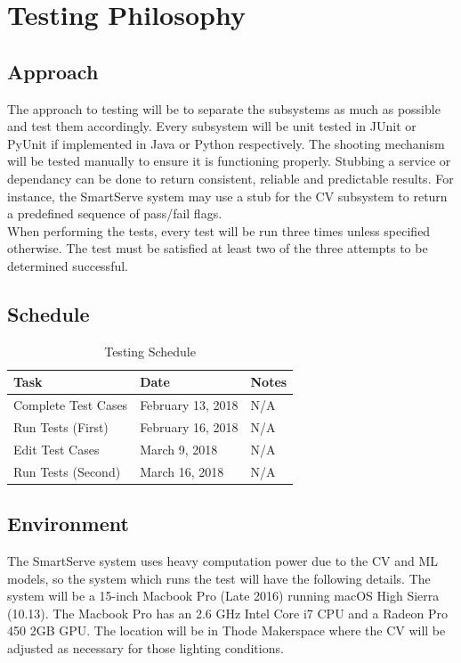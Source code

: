 \documentclass[11pt]{article}
\begin{document}
\section{Testing Philosophy}
\subsection{Approach}
The approach to testing will be to separate the subsystems as much as possible and test them accordingly. Every subsystem will be unit tested in JUnit or PyUnit if implemented in Java or Python respectively. The shooting mechanism will be tested manually to ensure it is functioning properly. Stubbing a service or dependancy can be done to return consistent, reliable and predictable results. For instance, the SmartServe system may use a stub for the CV subsystem to return a predefined sequence of pass/fail flags. \\
When performing the tests, every test will be run three times unless specified otherwise. The test must be satisfied at least two of the three attempts to be determined successful. 
\subsection{Schedule}
\begin{table}[H]
\centering
\label{my-label}
\begin{tabular}{|l|l|l|}
\hline
\textbf{Task} & \textbf{Date} & \textbf{Notes} \\ \hline
Complete Test Cases & February 13, 2018 & N/A \\ \hline
Run Tests (First) & February 16, 2018 & N/A \\ \hline
Edit Test Cases & March 9, 2018 & N/A \\ \hline
Run Tests (Second) & March 16, 2018 & N/A \\ \hline
\end{tabular}
\caption{Testing Schedule}
\end{table}
\subsection{Environment}
The SmartServe system uses heavy computation power due to the CV and ML models, so the system which runs the test will have the following details. The system will be a 15-inch Macbook Pro (Late 2016) running macOS High Sierra (10.13). The Macbook Pro has an 2.6 GHz Intel Core i7 CPU and a Radeon Pro 450 2GB GPU. The location will be in Thode Makerspace where the CV will be adjusted as necessary for those lighting conditions.
\end{document}
